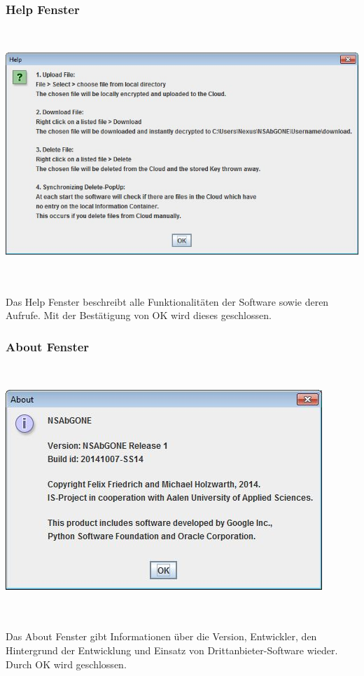 \documentclass[13pt,a4paper,bibliography=totocnumbered,listof=totocnumbered]{scrartcl}
\begin{document}
\subsubsection{Help Fenster}
$\;$\\
\begin{minipage}{\linewidth}
	\centering
	\includegraphics[width=0.4\linewidth]{./img/HelpPopUp.jpg}
	\label{HelpPopUp}
\end{minipage}
\\\\Das Help Fenster beschreibt alle Funktionalitäten der Software sowie deren Aufrufe. Mit der Bestätigung von OK wird dieses  geschlossen.

\subsubsection{About Fenster}
$\;$\\
\begin{minipage}{\linewidth}
	\centering
	\includegraphics[width=0.4\linewidth]{./img/AboutPopUp.jpg}
	\label{AboutPopUp}
\end{minipage}
\\\\Das About Fenster gibt Informationen über die Version, Entwickler, den Hintergrund der Entwicklung und Einsatz von Drittanbieter-Software wieder. Durch OK wird geschlossen.
\end{document}
